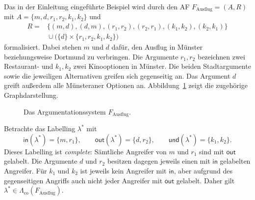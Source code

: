 \begin{Example}
    \label{ex:abendplanung-complete}
    Das in der Einleitung eingeführte Beispiel wird durch
    den AF \(F_{\mathrm{Ausflug}}=(A,R)\) mit
    \(
        A=\{m,d,r_1,r_2,k_1,k_2\}
    \)
    und
    \[
    \begin{aligned}
        R={}&\{(m,d),(d,m),(r_1,r_2),(r_2,r_1),
               (k_1,k_2),(k_2,k_1)\}\\
             &{}\cup
               \bigl(\{d\}\times\{r_1,r_2,k_1,k_2\}\bigr)
    \end{aligned}
    \]
    formalisiert. Dabei stehen \(m\) und \(d\) dafür, den Ausflug in Münster
    beziehungsweise Dortmund zu verbringen. Die Argumente \(r_1,r_2\)
    bezeichnen zwei Restaurant- und \(k_1,k_2\) zwei Kinooptionen in
    Münster. Die beiden Stadtargumente sowie die jeweiligen Alternativen
    greifen sich gegenseitig an. Das Argument \(d\) greift außerdem alle
    Münsteraner Optionen an.
    Abbildung~\ref{fig:ausflug-af} zeigt die zugehörige Graphdarstellung.

    \begin{figure}[htbp]
        \centering
        \caption{Das Argumentationssystem \(F_{\mathrm{Ausflug}}\).}
        \label{fig:ausflug-af}
    \end{figure}

    Betrachte das Labelling \(\lambda^\ast\) mit
    \[
        \mathsf{in}(\lambda^\ast)=\{m,r_1\},\qquad
        \mathsf{out}(\lambda^\ast)=\{d,r_2\},\qquad
        \mathsf{und}(\lambda^\ast)=\{k_1,k_2\}.
    \]
    Dieses Labelling ist \emph{complete}: Sämtliche Angreifer von \(m\)
    und \(r_1\) sind mit \(\mathsf{out}\) gelabelt. Die Argumente \(d\)
    und \(r_2\) besitzen dagegen jeweils einen mit \(\mathsf{in}\)
    gelabelten Angreifer. Für \(k_1\) und \(k_2\) ist jeweils kein
    Angreifer mit \(\mathsf{in}\), aber aufgrund des gegenseitigen
    Angriffs auch nicht jeder Angreifer mit \(\mathsf{out}\) gelabelt.
    Daher gilt
    \(
        \lambda^\ast\in\Lambda_{\mathrm{co}}(F_{\mathrm{Ausflug}}).
    \)
\end{Example}

